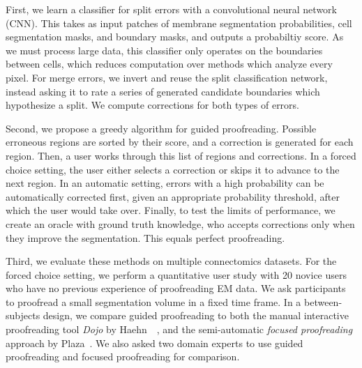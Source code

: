 First, we learn a classifier for split errors with a convolutional neural network (CNN). This takes as input patches of membrane segmentation probabilities, cell segmentation masks, and boundary masks, and outputs a probabiltiy score. As we must process large data, this classifier only operates on the boundaries between cells, which reduces computation over methods which analyze every pixel. For merge errors, we invert and reuse the split classification network, instead asking it to rate a series of generated candidate boundaries which hypothesize a split. We compute corrections for both types of errors.

Second, we propose a greedy algorithm for guided proofreading. Possible erroneous regions are sorted by their score, and a correction is generated for each region. Then, a user works through this list of regions and corrections. In a forced choice setting, the user either selects a correction or skips it to advance to the next region. In an automatic setting, errors with a high probability can be automatically corrected first, given an appropriate probability threshold, after which the user would take over. Finally, to test the limits of performance, we create an oracle with ground truth knowledge, who accepts corrections only when they improve the segmentation. This equals perfect proofreading.

Third, we evaluate these methods on multiple connectomics datasets. For the forced choice setting, we perform a quantitative user study with 20 novice users who have no previous experience of proofreading EM data. We ask participants to proofread a small segmentation volume in a fixed time frame. In a between-subjects design, we compare guided proofreading to both the manual interactive proofreading tool \textit{Dojo} by Haehn~\etal~\cite{haehn_dojo_2014}, and the semi-automatic \textit{focused proofreading} approach by Plaza~\cite{focused_proofreading}. We also asked two domain experts to use guided proofreading and focused proofreading for comparison.

